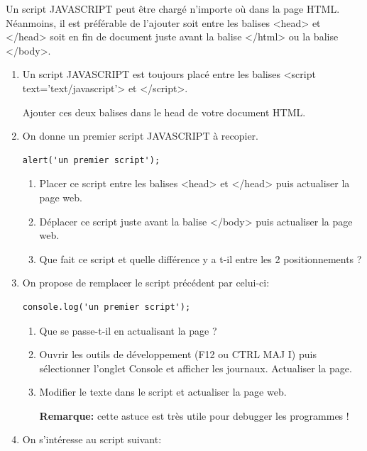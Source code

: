 \documentclass[12pt,a4paper]{article}
\begin{document}
Un script JAVASCRIPT peut être chargé n'importe où dans la page HTML. Néanmoins, il est préférable de l'ajouter soit entre les balises \textsf{<head>} et \textsf{</head>} soit en fin de document juste avant la balise \textsf{</html>} ou la balise \textsf{</body>}.

\begin{enumerate}
\item Un script JAVASCRIPT est toujours placé entre les balises \textsf{<script text='text/javascript'>} et \textsf{</script>}.

Ajouter ces deux balises dans le head de votre document HTML.

\item On donne un premier script JAVASCRIPT à recopier.

\begin{lstlisting}
alert('un premier script');
\end{lstlisting}

\begin{enumerate}
\item Placer ce script entre les balises \textsf{<head>} et \textsf{</head>} puis actualiser la page web.
\item Déplacer ce script juste avant la balise \textsf{</body>} puis actualiser la page web.
\item Que fait ce script et quelle différence y a t-il entre les 2 positionnements ?
\end{enumerate}

\item On propose de remplacer le script précédent par celui-ci:
\begin{lstlisting}
console.log('un premier script');
\end{lstlisting}

\begin{enumerate}
\item Que se passe-t-il en actualisant la page ?
\item Ouvrir les outils de développement (F12 ou CTRL MAJ I) puis sélectionner l'onglet \textsf{Console} et afficher les journaux. Actualiser la page.
\item Modifier le texte dans le script et actualiser la page web.

\textbf{Remarque:} cette astuce est très utile pour debugger les programmes !
\end{enumerate}

\item On s'intéresse au script suivant:


\end{enumerate}
\end{document}
